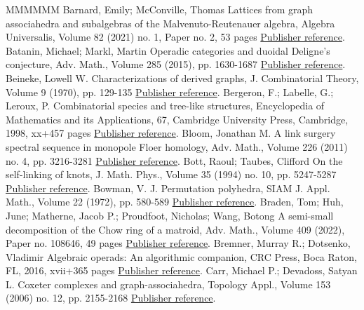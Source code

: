 \documentclass[11pt]{article}
\theoremstyle{definition}
\numberwithin{equation}{section}
\begin{document}
\begin{thebibliography}{MMMMMM}
 Barnard, Emily; McConville, Thomas Lattices from graph associahedra and subalgebras of the Malvenuto-Reutenauer algebra, Algebra Universalis, Volume 82 (2021) no. 1, Paper no. 2, 53 pages \href{https://alco.centre-mersenne.org/articles/10.5802/alco.347/#MR4176852}{Publisher reference}.
 Batanin, Michael; Markl, Martin Operadic categories and duoidal Deligne’s conjecture, Adv. Math., Volume 285 (2015), pp. 1630-1687 \href{https://alco.centre-mersenne.org/articles/10.5802/alco.347/#MR3406537}{Publisher reference}.
 Beineke, Lowell W. Characterizations of derived graphs, J. Combinatorial Theory, Volume 9 (1970), pp. 129-135 \href{https://alco.centre-mersenne.org/articles/10.5802/alco.347/#MR262097}{Publisher reference}.
 Bergeron, F.; Labelle, G.; Leroux, P. Combinatorial species and tree-like structures, Encyclopedia of Mathematics and its Applications, 67, Cambridge University Press, Cambridge, 1998, xx+457 pages \href{https://alco.centre-mersenne.org/articles/10.5802/alco.347/#MR1629341}{Publisher reference}.
 Bloom, Jonathan M. A link surgery spectral sequence in monopole Floer homology, Adv. Math., Volume 226 (2011) no. 4, pp. 3216-3281 \href{https://alco.centre-mersenne.org/articles/10.5802/alco.347/#MR2764887}{Publisher reference}.
 Bott, Raoul; Taubes, Clifford On the self-linking of knots, J. Math. Phys., Volume 35 (1994) no. 10, pp. 5247-5287 \href{https://alco.centre-mersenne.org/articles/10.5802/alco.347/#MR1295465}{Publisher reference}.
 Bowman, V. J. Permutation polyhedra, SIAM J. Appl. Math., Volume 22 (1972), pp. 580-589 \href{https://alco.centre-mersenne.org/articles/10.5802/alco.347/#MR305800}{Publisher reference}.
 Braden, Tom; Huh, June; Matherne, Jacob P.; Proudfoot, Nicholas; Wang, Botong A semi-small decomposition of the Chow ring of a matroid, Adv. Math., Volume 409 (2022), Paper no. 108646, 49 pages \href{https://alco.centre-mersenne.org/articles/10.5802/alco.347/#MR4477425}{Publisher reference}.
 Bremner, Murray R.; Dotsenko, Vladimir Algebraic operads: An algorithmic companion, CRC Press, Boca Raton, FL, 2016, xvii+365 pages \href{https://alco.centre-mersenne.org/articles/10.5802/alco.347/#MR3642294}{Publisher reference}.
 Carr, Michael P.; Devadoss, Satyan L. Coxeter complexes and graph-associahedra, Topology Appl., Volume 153 (2006) no. 12, pp. 2155-2168 \href{https://alco.centre-mersenne.org/articles/10.5802/alco.347/#MR2239078}{Publisher reference}.

\end{thebibliography}
\end{document}

